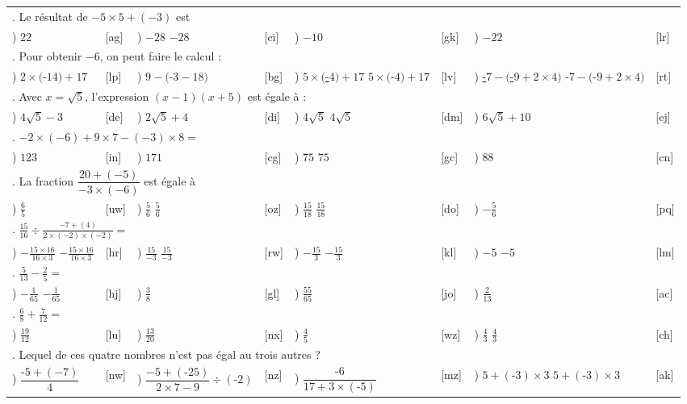 \documentclass[
	classe=$2^{de}$,
	exercices=Exercices\space chapitre\space 1
]{exercice}
\newcounter{QCMQuestionCounter}
\newcounter{QCMReponseCounter}
\newcommand{\QCMQuestion}[1]{
	\hline\multicolumn{8}{l}{\arabic{QCMQuestionCounter}. #1}\stepcounter{QCMQuestionCounter} \\
}
\newcommand{\QCMReponse}[8]{
	\setcounter{QCMReponseCounter}{1}         \alph{QCMReponseCounter}) #1 & [#2] & \stepcounter{QCMReponseCounter}           \alph{QCMReponseCounter}) #3 & [#4] & \stepcounter{QCMReponseCounter}           \alph{QCMReponseCounter}) #5 & [#6] & \stepcounter{QCMReponseCounter}           \alph{QCMReponseCounter}) #7 & [#8] \\
}
\newcommand{\QCMJuste}[1]{
\ifdefined\makeCorrection
\uline{#1}
\else
#1
\fi
}
\begin{document}
\begin{tabular}{llllllll}
	\QCMQuestion{Le résultat de $-5 × 5 + (-3)$ est}
	\QCMReponse{$22$}{ag}{\QCMJuste{$-28$}}{ci}{$-10$}{gk}{$-22$}{lr}
	\QCMQuestion{Pour obtenir $-6$, on peut faire le calcul :}
	\QCMReponse{$2 × ($-$14) + 17$}{lp}{$9 - ($-$3 - 18)$}{bg}{\QCMJuste{$5 × ($-$4) + 17$}}{lv}{\QCMJuste{-$7 - ($-$9 + 2 × 4)$}}{rt}
	\QCMQuestion{Avec $x=\sqrt{5}$, l'expression $(x-1)(x+5)$ est égale à :}
	\QCMReponse{$4\sqrt{5} - 3$}{de}{$2\sqrt{5} + 4$}{di}{\QCMJuste{$4\sqrt{5}$}}{dm}{$6\sqrt{5} + 10$}{ej}
	\QCMQuestion{$-2 × (-6) + 9 × 7 - (-3) × 8 =$}
	\QCMReponse{$123$}{in}{$171$}{cg}{\QCMJuste{$75$}}{gc}{$88$}{cn}
	\QCMQuestion{La fraction $\dfrac{20 + (-5)}{-3 × (-6)}$ est égale à}
	\QCMReponse{$\frac{6}{5}$}{uw}{\QCMJuste{$\frac{5}{6}$}}{oz}{\QCMJuste{$\frac{15}{18}$}}{do}{$-\frac{5}{6}$}{pq}
	\QCMQuestion{$\frac{15}{16} ÷ \frac{-7 + (4)}{2 × (-2) × (-2)} =$}
	\QCMReponse{\QCMJuste{$-\frac{15 × 16}{16 × 3}$}}{hr}{\QCMJuste{$\frac{15}{-3}$}}{rw}{\QCMJuste{$-\frac{15}{3}$}}{kl}{\QCMJuste{$-5$}}{lm}
	\QCMQuestion{$\frac{5}{13}-\frac{2}{5} =$}
	\QCMReponse{\QCMJuste{$-\frac{1}{65}$}}{hj}{$\frac{3}{8}$}{gl}{$\frac{55}{65}$}{jo}{$\frac{2}{13}$}{ac}
	\QCMQuestion{$\frac{6}{8} + \frac{7}{12} =$}
	\QCMReponse{$\frac{19}{12}$}{lu}{$\frac{13}{20}$}{nx}{$\frac{4}{5}$}{wz}{\QCMJuste{$\frac{4}{3}$}}{ch}
	\QCMQuestion{Lequel de ces quatre nombres n'est pas égal au trois autres ?}
	\QCMReponse{$\dfrac{\text{-}5 + (-7)}{4}$}{nw}{$\dfrac{-5 + (\text{-}25)}{2 × 7 - 9} ÷ (\text{-}2)$}{nz}{$\dfrac{\text{-}6}{17 + 3 × (\text{-}5)}$}{mz}{\QCMJuste{$5 + (\text{-}3) × 3$}}{ak}
\end{tabular}
\end{document}

